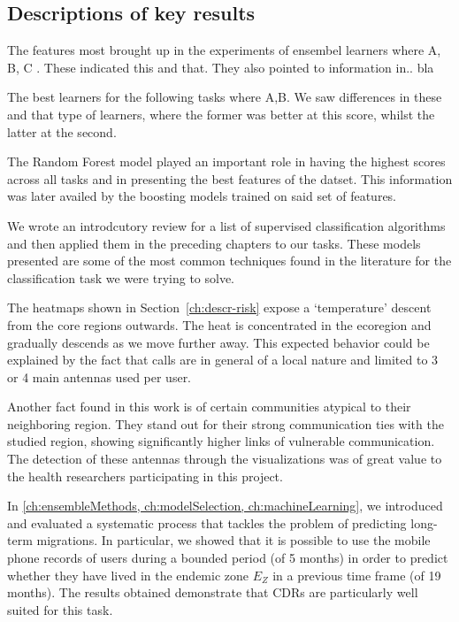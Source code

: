 \subsection{Descriptions of key results}



The features most brought up in the experiments of ensembel learners where A, B, C .
These indicated this and that.
They also pointed to information in.. bla


The best learners for the following tasks where A,B.
We saw differences in these and that type of learners, where the former was better at this score, whilst the latter at the second.

The Random Forest model played an important role in having the highest scores across all tasks and in presenting the best features of the datset.
This information was later availed by the boosting models trained on said set of features.


We wrote an introdcutory review for a list of supervised classification algorithms and then applied them in the preceding chapters to our tasks.
These models presented are some of the most common techniques found in the literature for the classification task we were trying to solve.



The heatmaps shown in Section~\cref{ch:descr-risk} expose a `temperature' descent from the core regions outwards.
The heat is concentrated in the ecoregion and gradually descends as we move further away.
 This expected behavior could be explained by the fact that calls are in general of a local nature and limited to 3 or 4 main antennas used per user.

Another fact found in this work is of certain communities atypical to their neighboring region.
They stand out for their strong communication ties with the studied region, showing significantly higher links of vulnerable communication.
The detection of these antennas through the visualizations was of great value to the health researchers participating in this project.

In \cref{ch:ensembleMethods, ch:modelSelection, ch:machineLearning}, we introduced and evaluated a systematic process that tackles the problem of predicting long-term migrations.
In particular, we showed that it is possible to use the mobile phone records of users during a bounded period (of 5 months) in order to predict whether they have lived in the endemic zone $E_Z$ in a previous time frame (of 19 months).
The results obtained demonstrate that CDRs are particularly well suited for this task.

